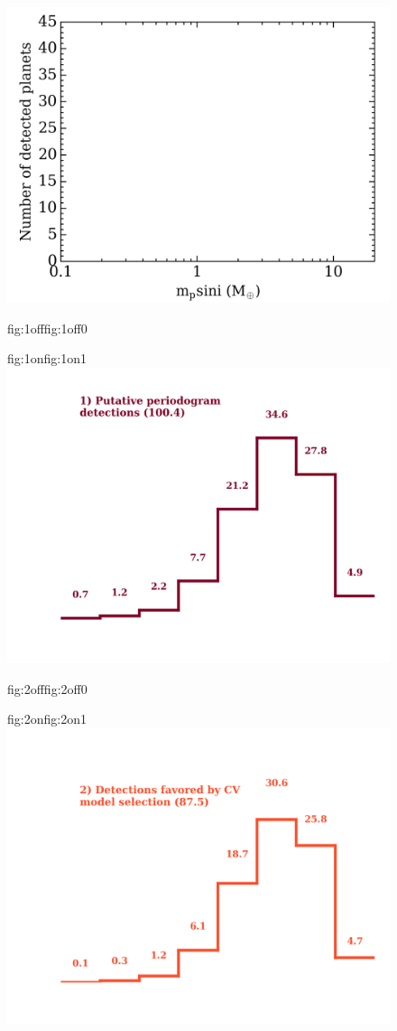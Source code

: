 \begin{figure}
  \centering
  \includegraphics[width=0.6\hsize]{figures/detectedpopulations_bkgd.png}%
  \hspace{-0.6\hsize}%
  \begin{ocg}{fig:1off}{fig:1off}{0}%
  \end{ocg}%
  \begin{ocg}{fig:1on}{fig:1on}{1}%
    \includegraphics[width=0.6\hsize]{figures/detectedpopulations_1.png}%
  \end{ocg}
  \hspace{-0.6\hsize}%
  \begin{ocg}{fig:2off}{fig:2off}{0}%
  \end{ocg}%
  \begin{ocg}{fig:2on}{fig:2on}{1}%
    \includegraphics[width=0.6\hsize]{figures/detectedpopulations_2.png}%

\end{ocg}
\end{figure}
